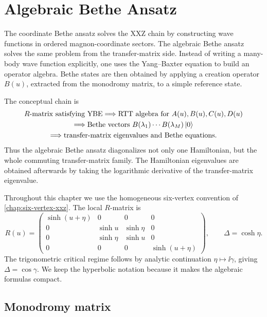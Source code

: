 \chapter{Algebraic Bethe Ansatz}
\label{chap:algebraic-bethe-ansatz}

The coordinate Bethe ansatz solves the XXZ chain by constructing wave functions in
ordered magnon-coordinate sectors.  The algebraic Bethe ansatz solves the same
problem from the transfer-matrix side.  Instead of writing a many-body wave
function explicitly, one uses the Yang--Baxter equation to build an operator
algebra.  Bethe states are then obtained by applying a creation operator
$B(u)$, extracted from the monodromy matrix, to a simple reference state.

The conceptual chain is
\[
\begin{gathered}
    R\text{-matrix satisfying YBE}
    \Longrightarrow
    \text{RTT algebra for }A(u),B(u),C(u),D(u) \\
    \Longrightarrow
    \text{Bethe vectors }B(\lambda_1)\cdots B(\lambda_M)\left|0\right\rangle \\
    \Longrightarrow
    \text{transfer-matrix eigenvalues and Bethe equations}.
\end{gathered}
\]
Thus the algebraic Bethe ansatz diagonalizes not only one Hamiltonian, but the
whole commuting transfer-matrix family.  The Hamiltonian eigenvalues are obtained
afterwards by taking the logarithmic derivative of the transfer-matrix
eigenvalue.

Throughout this chapter we use the homogeneous six-vertex convention of
\cref{chap:six-vertex-xxz}.  The local $R$-matrix is
\begin{equation}
\label{eq:aba-six-vertex-R}
    R(u)=
    \begin{pmatrix}
        \sinh(u+\eta)&0&0&0\\
        0&\sinh u&\sinh\eta&0\\
        0&\sinh\eta&\sinh u&0\\
        0&0&0&\sinh(u+\eta)
    \end{pmatrix},
    \qquad
    \Delta=\cosh\eta .
\end{equation}
The trigonometric critical regime follows by analytic continuation
$\eta\mapsto \ii\gamma$, giving $\Delta=\cos\gamma$.  We keep the hyperbolic
notation because it makes the algebraic formulas compact.

\section{Monodromy matrix}
\label{sec:aba-monodromy-matrix}

